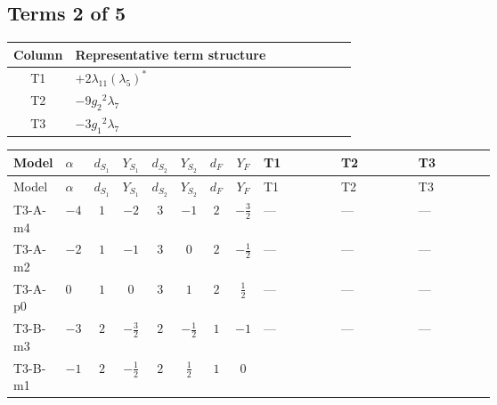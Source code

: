 \documentclass[8pt]{article}
\begin{document}
\begin{landscape}
\subsection*{Terms 2 of 5}
\begin{center}
\begin{tabular}{@{}c >{\raggedright\arraybackslash}p{0.82\linewidth}@{}}
\toprule
Column & Representative term structure \\
\midrule
T1 & \(\displaystyle +2 {\lambda_{11}} \left({\lambda_5}\right)^{*}\) \\
\midrule
T2 & \(\displaystyle -9 {g_2}^2 {\lambda_{7}}\) \\
\midrule
T3 & \(\displaystyle -3 {g_1}^2 {\lambda_{7}}\) \\
\midrule
\bottomrule
\end{tabular}
\end{center}
\smallskip
\tiny
\begin{longtable}{@{}llcccccc >{\raggedright\arraybackslash}p{0.21\linewidth} >{\raggedright\arraybackslash}p{0.21\linewidth} >{\raggedright\arraybackslash}p{0.21\linewidth}@{}}
\toprule
Model & $\alpha$ & $d_{S_1}$ & $Y_{S_1}$ & $d_{S_2}$ & $Y_{S_2}$ & $d_F$ & $Y_F$ & T1 & T2 & T3 \\
\midrule
\endfirsthead
\toprule
Model & $\alpha$ & $d_{S_1}$ & $Y_{S_1}$ & $d_{S_2}$ & $Y_{S_2}$ & $d_F$ & $Y_F$ & T1 & T2 & T3 \\
\midrule
\endhead
T3-A-m4 & $-4$ & $1$ & $-2$ & $3$ & $-1$ & $2$ & $-\frac{3}{2}$ & --- & --- & --- \\
\midrule
T3-A-m2 & $-2$ & $1$ & $-1$ & $3$ & $0$ & $2$ & $-\frac{1}{2}$ & --- & --- & --- \\
\midrule
T3-A-p0 & $0$ & $1$ & $0$ & $3$ & $1$ & $2$ & $\frac{1}{2}$ & --- & --- & --- \\
\midrule
T3-B-m3 & $-3$ & $2$ & $-\frac{3}{2}$ & $2$ & $-\frac{1}{2}$ & $1$ & $-1$ & --- & --- & --- \\
\midrule
T3-B-m1 & $-1$ & $2$ & $-\frac{1}{2}$ & $2$ & $\frac{1}{2}$ & $1$ & $0$ & \scriptsize\adjustbox{max width=\linewidth}{$\begin{gathered} +2 {\lambda_{11}} \left({\lambda_5}\right)^{*}\end{gathered}$} & \scriptsize\adjustbox{max width=\linewidth}{$\begin{gathered} -9 {g_2}^2 {\lambda_{7}}\end{gathered}$} & \scriptsize\adjustbox{max width=\linewidth}{$\begin{gathered} -3 {g_1}^2 {\lambda_{7}}\end{gathered}$} \\

\end{longtable}
\end{landscape}
\end{document}
